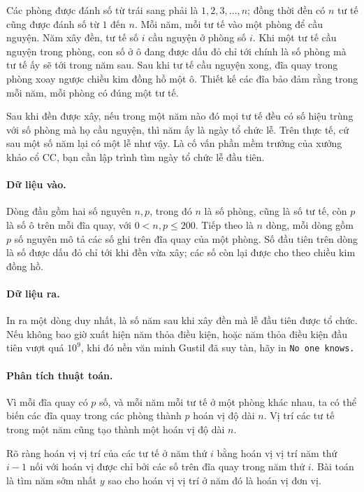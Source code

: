 \documentclass[11pt]{article}
\begin{document}
Các phòng được đánh số từ trái sang phải là \(1,2,3,\ldots,n\); đồng thời đền
có \(n\) tư tế cũng được đánh số từ \(1\) đến \(n\). Mỗi năm, mỗi tư tế vào
một phòng để cầu nguyện. Năm xây đền, tư tế số \(i\) cầu nguyện ở phòng số
\(i\). Khi một tư tế cầu nguyện trong phòng, con số ở ô đang được dấu đỏ chỉ
tới chính là số phòng mà tư tế ấy sẽ tới trong năm sau. Sau khi tư tế cầu
nguyện xong, đĩa quay trong phòng xoay ngược chiều kim đồng hồ một ô. Thiết kế
các đĩa bảo đảm rằng trong mỗi năm, mỗi phòng có đúng một tư tế.

Sau khi đền được xây, nếu trong một năm nào đó mọi tư tế đều có số hiệu trùng
với số phòng mà họ cầu nguyện, thì năm ấy là ngày tổ chức lễ. Trên thực tế, cứ
sau một số năm lại có một lễ như vậy. Là cố vấn phần mềm trưởng của xưởng khảo
cổ CC, bạn cần lập trình tìm ngày tổ chức lễ đầu tiên.

\paragraph{Dữ liệu vào.}
Dòng đầu gồm hai số nguyên \(n,p\), trong đó \(n\) là số phòng, cũng là số tư
tế, còn \(p\) là số ô trên mỗi đĩa quay, với \(0<n,p\le 200\). Tiếp theo là
\(n\) dòng, mỗi dòng gồm \(p\) số nguyên mô tả các số ghi trên đĩa quay của
một phòng. Số đầu tiên trên dòng là số được dấu đỏ chỉ tới khi đền vừa xây;
các số còn lại được cho theo chiều kim đồng hồ.

\paragraph{Dữ liệu ra.}
In ra một dòng duy nhất, là số năm sau khi xây đền mà lễ đầu tiên được tổ chức.
Nếu không bao giờ xuất hiện năm thỏa điều kiện, hoặc năm thỏa điều kiện đầu
tiên vượt quá \(10^9\), khi đó nền văn minh Gustil đã suy tàn, hãy in
\texttt{No one knows.}

\paragraph{Phân tích thuật toán.}
Vì mỗi đĩa quay có \(p\) số, và mỗi năm mỗi tư tế ở một phòng khác nhau, ta có
thể biến các đĩa quay trong các phòng thành \(p\) hoán vị độ dài \(n\). Vị trí
các tư tế trong một năm cũng tạo thành một hoán vị độ dài \(n\).

Rõ ràng hoán vị vị trí của các tư tế ở năm thứ \(i\) bằng hoán vị vị trí năm
thứ \(i-1\) nối với hoán vị được chỉ bởi các số trên đĩa quay trong năm thứ
\(i\). Bài toán là tìm năm sớm nhất \(y\) sao cho hoán vị vị trí ở năm đó là
hoán vị đơn vị.
\end{document}
